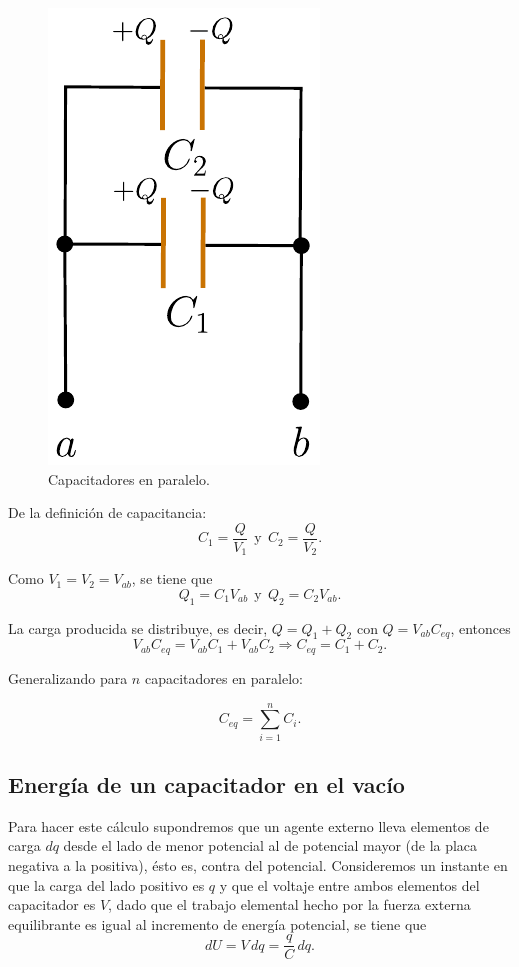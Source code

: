 \begin{enumerate}
\begin{figure}[H]
    \centering
    \includegraphics[scale = 0.8]{Figuras/Capacitador-Paralelo.pdf}
    \caption{Capacitadores en paralelo.}
    \label{fig:Cap-Paralelo}
\end{figure}

De la definición de capacitancia:
$$C_1 = \frac{Q}{V_1} ~~\text{y}~~ C_2 = \frac{Q}{V_2}.$$

Como $V_1 = V_2 = V_{ab}$, se tiene que
$$Q_1 = C_1 V_{ab}  ~~\text{y}~~ Q_2 = C_2 V_{ab}.$$

La carga producida se distribuye, es decir, $Q= Q_1 + Q_2$ con $Q = V_{ab} C_{eq}$, entonces
$$V_{ab}C_{eq} = V_{ab} C_1 +  V_{ab} C_2 \Rightarrow C_{eq} = C_1 + C_2.$$

Generalizando para $n$ capacitadores en paralelo:
\begin{shaded}
    $$C_{eq} = \sum_{i=1}^n C_i.$$
\end{shaded}

\end{enumerate}

\subsection*{Energía de un capacitador en el vacío}

Para hacer este cálculo supondremos que  un agente externo lleva elementos de carga $dq$ desde el lado de menor potencial al de potencial mayor (de la placa negativa a la positiva), ésto es, contra del potencial. Consideremos un instante en que la carga del lado positivo es $q$ y que el voltaje entre ambos elementos del capacitador es $V$, dado que el trabajo elemental hecho por la fuerza externa equilibrante es igual al incremento de energía potencial, se tiene que
$$dU = V \,dq = \frac{q}{C} \,dq.$$

